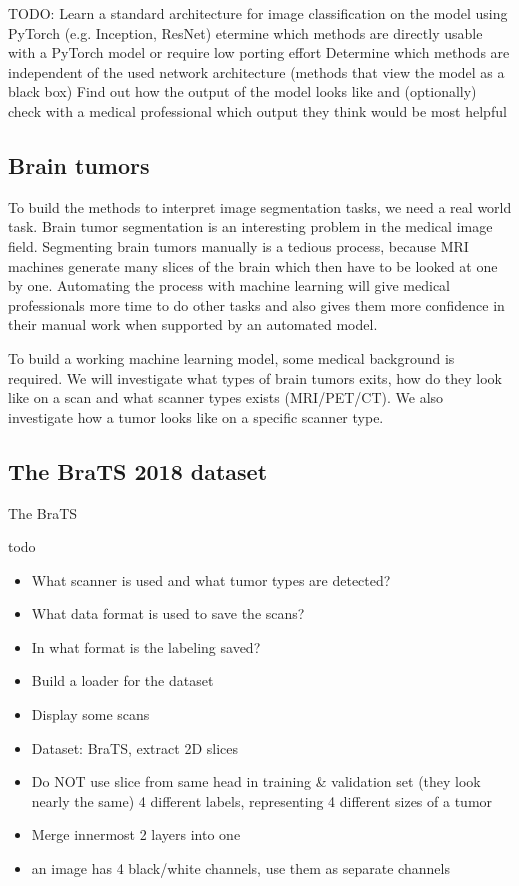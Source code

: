 TODO:
Learn a standard architecture for image classification on the model using PyTorch (e.g. Inception, ResNet)
etermine which methods are directly usable with a PyTorch model or require low porting effort
Determine which methods are independent of the used network architecture (methods that view the model as a black box)
Find out how the output of the model looks like and (optionally) check with a medical professional which output they think would be most helpful

\subsection{Brain tumors}
To build the methods to interpret image segmentation tasks, we need a real world task. Brain tumor segmentation is an interesting problem in the medical image field. Segmenting brain tumors manually is a tedious process, because MRI machines generate many slices of the brain which then have to be looked at one by one. Automating the process with machine learning will give medical professionals more time to do other tasks and also gives them more confidence in their manual work when supported by an automated model.

To build a working machine learning model, some medical background is required. We will investigate what types of brain tumors exits, how do they look like on a scan and what scanner types exists (MRI/PET/CT). We also investigate how a tumor looks like on a specific scanner type.

\subsection{The BraTS 2018 dataset}
The BraTS\cite{menze2015multimodal}



todo
\begin{itemize}
    \item What scanner is used and what tumor types are detected?
    \item What data format is used to save the scans?
    \item In what format is the labeling saved?
    \item Build a loader for the dataset
    \item Display some scans
    \item Dataset: BraTS, extract 2D slices
    \item Do NOT use slice from same head in training \& validation set (they look nearly the same) 4 different labels, representing 4 different sizes of a tumor
    \item Merge innermost 2 layers into one
    \item an image has 4 black/white channels, use them as separate channels
\end{itemize}

